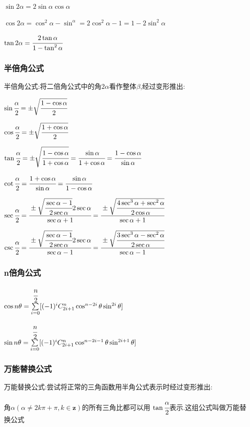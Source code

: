 {{{    $\sin2\alpha = 2\sin\alpha\cos\alpha$

    $\cos2\alpha = \cos^2\alpha - \sin^\alpha = 2\cos^2\alpha - 1 = 1 - 2\sin^2\alpha$

    $\tan2\alpha = \cfrac{2\tan\alpha}{1 - \tan^2\alpha}$
  }%

  \subsubsection{半倍角公式}{
    半倍角公式:将二倍角公式中的角$2\alpha$看作整体$\beta$,经过变形推出:

    $\sin\cfrac{\alpha}{2} = \pm\sqrt{\cfrac{1 - \cos\alpha}{2}}$

    $\cos\cfrac{\alpha}{2} = \pm\sqrt{\cfrac{1 + \cos\alpha}{2}}$

    $\tan\cfrac{\alpha}{2} = \pm\sqrt{\cfrac{1-\cos\alpha}{1+\cos\alpha}} = \cfrac{\sin\alpha}{1+\cos\alpha} = \cfrac{1-\cos\alpha}{\sin\alpha}$

    $\cot\cfrac{\alpha}{2} = \cfrac{1+\cos\alpha}{\sin\alpha} = \cfrac{\sin\alpha}{1-\cos\alpha}$

    $\sec\cfrac{\alpha}{2} = \cfrac{\pm\sqrt{\cfrac{\sec\alpha - 1}{2\sec\alpha}}2\sec\alpha}{\sec\alpha + 1} = \cfrac{\pm\sqrt{\cfrac{4\sec^3\alpha + \sec^2\alpha}{2\cos\alpha}}}{\sec\alpha + 1}$

    $\csc\cfrac{\alpha}{2} = \cfrac{\pm\sqrt{\cfrac{\sec\alpha - 1}{2\sec\alpha}}2\sec\alpha}{\sec\alpha - 1} = \cfrac{\pm\sqrt{\cfrac{3\sec^3\alpha - \sec^2\alpha}{2\sec\alpha}}}{\sec\alpha - 1}$
  }%

  \subsubsection{n倍角公式}{
    $\cos{n\theta} = \upDownSum{\cfrac{n}{2}}{i = 0}[(-1)^i\mathCombination{2i + 1}{n}\cos^{n - 2i}\theta\sin^{2i}\theta]$

    $\sin{n\theta} = \upDownSum{\cfrac{n}{2}}{i = 0}[(-1)^i\mathCombination{2i + 1}{n}\cos^{n - 2i - 1}\theta\sin^{2i+1}\theta]$
  }%

  \subsubsection{万能替换公式}{
    万能替换公式:尝试将正常的三角函数用半角公式表示时经过变形推出:

    角$\alpha(\alpha \neq 2k\pi + \pi ,k \in \mathbf{z})$的所有三角比都可以用 $\tan\cfrac{\alpha}{2}$表示.这组公式叫做万能替换公式

}}}
